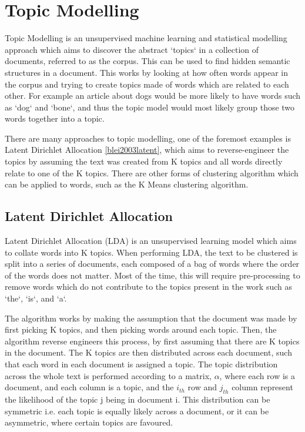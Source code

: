 \section{Topic Modelling}
\label{topic}
Topic Modelling is an unsupervised machine learning and statistical modelling approach which aims to discover the abstract `topics` in a collection of documents, referred to as the corpus. This can be used to find hidden semantic structures in a document. This works by looking at how often words appear in the corpus and trying to create topics made of words which are related to each other. For example an article about dogs would be more likely to have words such as `dog` and `bone`, and thus the topic model would most likely group those two words together into a topic. 

There are many approaches to topic modelling, one of the foremost examples is Latent Dirichlet Allocation \ref{blei2003latent}, which aims to reverse-engineer the topics by assuming the text was created from K topics and all words directly relate to one of the K topics. There are other forms of clustering algorithm which can be applied to words, such as the K Means clustering algorithm. 

\subsection{Latent Dirichlet Allocation}
Latent Dirichlet Allocation (LDA) is an unsupervised learning model which aims to collate words into K topics. When performing LDA, the text to be clustered is split into a series of documents, each composed of a bag of words where the order of the words does not matter. Most of the time, this will require pre-processing to remove words which do not contribute to the topics present in the work such as `the`, `is`,  and `a`. 

\noindent The algorithm works by making the assumption that the document was made by first picking K topics, 
and then picking words around each topic. Then, the algorithm reverse engineers this process, by first assuming that there are K topics in the document. The K topics are then distributed across each document, such that each word in each document is assigned a topic. The topic distribution across the whole text is performed according to a matrix, $\alpha$,  where each row is a document, and each column is a topic, and the $i_{th}$ row and $j_{th}$ column represent the likelihood of the topic j being in document i. This distribution can be symmetric i.e. each topic is equally likely across a document, or it can be asymmetric, where certain topics are favoured.

